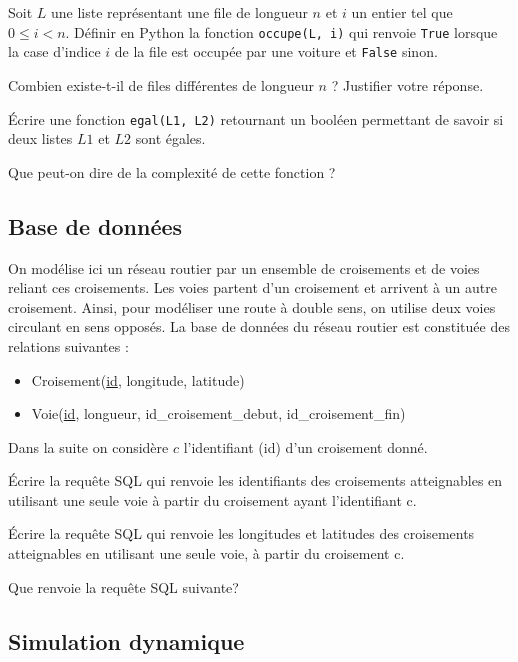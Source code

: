 \question{} Soit $L$ une liste représentant une file de longueur $n$ et $i$ un entier tel que $0\leqslant i < n$.
Définir en Python la fonction \lstinline{occupe(L, i)} qui renvoie \lstinline{True} lorsque la case d'indice $i$ de la file
est occupée par une voiture et \lstinline{False} sinon.

\question{} Combien existe-t-il de files différentes de longueur $n$ ? Justifier votre réponse.

\question{} \'Ecrire une fonction \lstinline{egal(L1, L2)} retournant un booléen permettant de savoir si deux listes $L1$ et $L2$ sont égales.

\question{} Que peut-on dire de la complexité de cette fonction ?


\subsection{ Base de données}

On modélise ici un réseau routier par un ensemble de croisements et de voies reliant ces croisements.
Les voies partent d'un croisement et arrivent à un autre croisement. Ainsi, pour modéliser une route
à double sens, on utilise deux voies circulant en sens opposés.
La base de données du réseau routier est constituée des relations suivantes :
\begin{itemize}
	\item[\textbullet]  Croisement(\underline{id}, longitude, latitude)
    \item[\textbullet] Voie(\underline{id}, longueur, id\_croisement\_debut, id\_croisement\_fin)
\end{itemize}

Dans la suite on considère $c$ l'identifiant (id) d'un croisement donné.

\question{} \' Ecrire la requête SQL qui renvoie les identifiants des croisements atteignables en utilisant une seule voie à partir du croisement ayant l'identifiant c.

\question{} \'Ecrire la requête SQL qui renvoie les longitudes et latitudes des croisements atteignables en utilisant une seule voie, à partir du croisement c.

\question{} Que renvoie la requête SQL suivante?

% 

\subsection{Simulation dynamique}
 
